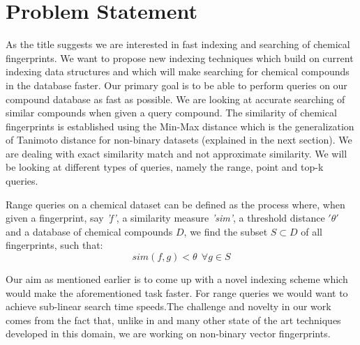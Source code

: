 
\section{Problem Statement}

As the title suggests we are interested in fast indexing and searching of chemical fingerprints. We want to propose new indexing techniques which build on current indexing data structures and which will make searching for chemical compounds in the database faster. Our primary goal is to be able to perform queries on our compound database as fast as possible.
We are looking at accurate searching of similar compounds when given a query compound. The similarity of chemical fingerprints is established using the Min-Max distance which is the generalization of Tanimoto distance for non-binary datasets (explained in the next section). We are dealing with exact similarity match and not approximate similarity. We will be looking at different types of queries, namely the range, point and top-k queries.\\

\begin{problem}{
Range queries on a chemical dataset can be defined as the process where, when given a fingerprint, say \textit{'f'}, a similarity measure \textit{'sim'}, a threshold distance \textbf{$'\theta'$} and a database of chemical compounds $D$, we find the subset $S \subset D$ of all fingerprints, such that: \\
\begin{equation}
sim(f,g) < \theta ~~ \forall  \textbf{$g\in S$}
\end{equation}
}
\end{problem}
 
%

Our aim as mentioned earlier is to come up with a novel indexing scheme which would make the aforementioned task faster. For range queries we would want to achieve sub-linear search time speeds.The challenge and novelty in our work comes from the fact that, unlike in  \citet*{swamidass2007bounds} and many other state of the art techniques developed in this domain, we are working on non-binary vector fingerprints. \\

